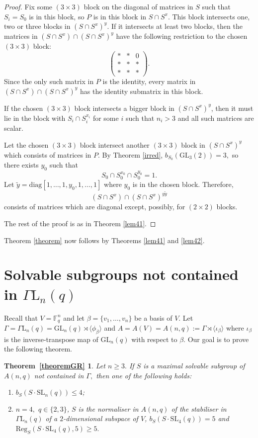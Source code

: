 \documentclass[a4paper,reqno,11pt]{amsart}
\newtheorem*{T4}{Theorem~\ref{theoremGR}}
\theoremstyle{definition}
\theoremstyle{remark}
\numberwithin{equation}{section}
\newcommand{\diag}{\mathrm{diag}}
\newcommand{\Reg}{\mathrm{Reg}}
\newcommand{\GaL}{{\Gamma \mathrm{L}}}
\newcommand{\SL}{{\mathrm{SL}}}
\newcommand{\GL}{{\mathrm{GL}}}
\begin{document}
\begin{proof}
 Fix some $(3\times 3)$ block on the diagonal of matrices in $S$ such that $S_i=S_0$ is in this block, so $P$ is in this block in $S \cap S^x$.
 This block intersects  one, two or three blocks in $(S \cap S^x)^y.$  
If it intersects  at least two blocks, then the  matrices in $(S \cap S^x) \cap (S \cap S^x)^y$ have the following restriction  to the chosen $(3 \times 3)$ block:
$$
\begin{pmatrix}
*&*&0\\
*&*&*\\
*&*&*
\end{pmatrix}. 
$$ 
Since  the only such matrix in $P$ is the identity, every matrix in $(S \cap S^x) \cap (S \cap S^x)^y$ has the identity submatrix in this block.  

If the chosen $(3 \times 3)$ block intersects  a bigger block in $(S \cap S^x)^y$, then it must lie in the block with  $S_i \cap S_i^{x_i}$ for some $i$ such that $n_i>3$ and  all such matrices are scalar.

Let the chosen $(3 \times 3)$ block intersect another $(3 \times 3)$ block in $(S \cap S^x)^y$ which consists of matrices in $P$. By Theorem \ref{irred}, $b_{S_0}(\GL_3(2))=3,$ so there exists $y_0$ such that $$S_0 \cap S_0^{x_0} \cap S_0^{y_0} =1.$$ Let $\tilde{y}=\diag[1, \ldots, 1, y_0, 1, \ldots, 1]$ where $y_0$ is in the chosen block. Therefore,
 $$(S \cap S^x) \cap (S \cap S^x)^{y\tilde{y}}$$
consists of matrices which are diagonal except, possibly, for $(2 \times 2)$ blocks.

The rest of the proof is  as in Theorem \ref{lem41}. 
\end{proof}

Theorem \ref{theorem} now follows by Theorems \ref{lem41} and \ref{lem42}.

\section{Solvable subgroups not contained in $\GaL_n(q)$}
\label{sec412}



Recall that $V=\mathbb{F}_q^n$ and let $\beta=\{v_1, \ldots, v_n\}$ be a basis of $V$. Let $\Gamma= \GaL _n(q)= \GL_n(q) \rtimes \langle  \phi_{\beta} \rangle$
and $A=A(V)=A(n,q):=\Gamma \rtimes \langle \iota_{\beta} \rangle$ where $\iota_{\beta}$ is the inverse-transpose  map of $\GL_n(q)$ with respect to $\beta.$  Our goal is to prove the following theorem.

\begin{T4}
Let $n\ge 3.$ If $S$ is a maximal solvable subgroup of $A(n,q)$ not contained in $\Gamma,$ then one of the following holds:
\begin{enumerate}
\item[$(1)$] $b_S(S \cdot \SL_n(q))\le 4$;
\item[$(2)$] $n=4,$ $q \in \{2,3\}$, $S$ is the normaliser in $A(n,q)$ of the stabiliser in $\GaL_n(q)$ of a $2$-dimensional subspace of $V$, $b_S(S \cdot \SL_4(q))=5$ and $\Reg_S(S \cdot \SL_4(q),5)\ge 5.$
\end{enumerate}
\end{T4} 
\end{document}
